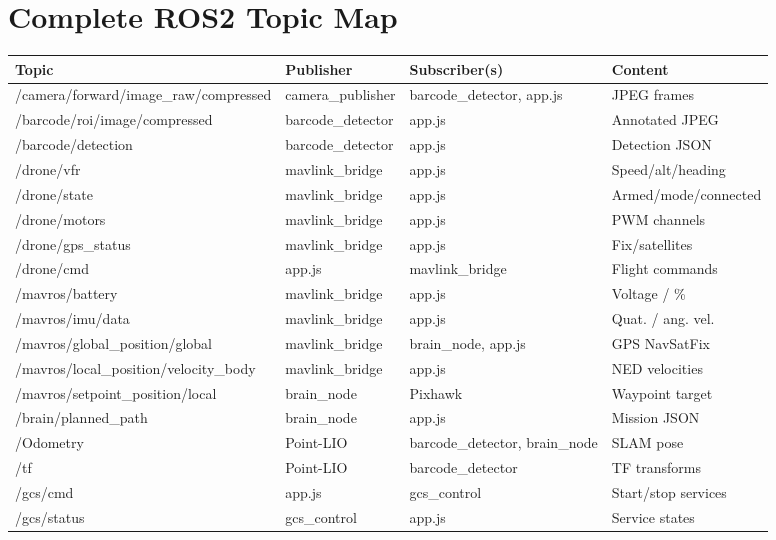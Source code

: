 \documentclass[11pt,a4paper]{article}
\begin{document}
\section{Complete ROS2 Topic Map}

{\footnotesize
\begin{longtable}{>{\ttfamily\raggedright\arraybackslash}p{4.8cm}
                  >{\raggedright\arraybackslash}p{2.4cm}
                  >{\raggedright\arraybackslash}p{3.0cm}
                  >{\raggedright\arraybackslash}p{3.4cm}}
  \toprule
  \normalfont\textbf{Topic} & \textbf{Publisher} & \textbf{Subscriber(s)} & \textbf{Content} \\
  \midrule
  /camera/forward/image\_raw/compressed & camera\_publisher & barcode\_detector, app.js & JPEG frames \\[2pt]
  /barcode/roi/image/compressed & barcode\_detector & app.js & Annotated JPEG \\[2pt]
  /barcode/detection & barcode\_detector & app.js & Detection JSON \\[2pt]
  /drone/vfr & mavlink\_bridge & app.js & Speed/alt/heading \\[2pt]
  /drone/state & mavlink\_bridge & app.js & Armed/mode/connected \\[2pt]
  /drone/motors & mavlink\_bridge & app.js & PWM channels \\[2pt]
  /drone/gps\_status & mavlink\_bridge & app.js & Fix/satellites \\[2pt]
  /drone/cmd & app.js & mavlink\_bridge & Flight commands \\[2pt]
  /mavros/battery & mavlink\_bridge & app.js & Voltage / \% \\[2pt]
  /mavros/imu/data & mavlink\_bridge & app.js & Quat. / ang. vel. \\[2pt]
  /mavros/global\_position/global & mavlink\_bridge & brain\_node, app.js & GPS NavSatFix \\[2pt]
  /mavros/local\_position/velocity\_body & mavlink\_bridge & app.js & NED velocities \\[2pt]
  /mavros/setpoint\_position/local & brain\_node & Pixhawk & Waypoint target \\[2pt]
  /brain/planned\_path & brain\_node & app.js & Mission JSON \\[2pt]
  /Odometry & Point-LIO & barcode\_detector, brain\_node & SLAM pose \\[2pt]
  /tf & Point-LIO & barcode\_detector & TF transforms \\[2pt]
  /gcs/cmd & app.js & gcs\_control & Start/stop services \\[2pt]
  /gcs/status & gcs\_control & app.js & Service states \\
  \bottomrule
\end{longtable}
}
\end{document}
